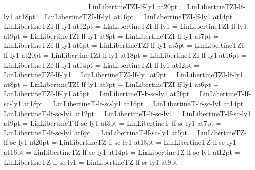 \scriptscriptfont\itfam=\fiveit
%
\def\sl{\fam=\slfam \tensl}%
\textfont\slfam=\tensl
\scriptfont\slfam=\sevensl
\scriptscriptfont\slfam=\fivesl
%
\def\bf{\fam=\bffam \tenbf}%
\textfont\bffam=\tenbf
\scriptfont\bffam=\sevenbf
\scriptscriptfont\bffam=\fivebf
%
\def\tt{\fam=\ttfam \tentt}%
\textfont\ttfam=\tentt
\scriptfont\ttfam=\seventt
\scriptscriptfont\ttfam=\fivett
%
\font\twentyitbf=      LinLibertineTZI-lf-ly1 at20pt
\font\eighteenitbf=    LinLibertineTZI-lf-ly1 at18pt
\font\sixteenitbf=     LinLibertineTZI-lf-ly1 at16pt
\font\fourteenitbf=    LinLibertineTZI-lf-ly1 at14pt
\font\twelveitbf=      LinLibertineTZI-lf-ly1 at12pt
\font\itbf=            LinLibertineTZI-lf-ly1
\font\nineitbf=        LinLibertineTZI-lf-ly1 at9pt
\font\eightitbf=       LinLibertineTZI-lf-ly1 at8pt
\font\sevenitbf=       LinLibertineTZI-lf-ly1 at7pt
\font\sixitbf=         LinLibertineTZI-lf-ly1 at6pt
\font\fiveitbf=        LinLibertineTZI-lf-ly1 at5pt
%
\font\twentyslbf=      LinLibertineTZI-lf-ly1 at20pt
\font\eighteenslbf=    LinLibertineTZI-lf-ly1 at18pt
\font\sixteenslbf=     LinLibertineTZI-lf-ly1 at16pt
\font\fourteenslbf=    LinLibertineTZI-lf-ly1 at14pt
\font\twelveslbf=      LinLibertineTZI-lf-ly1 at12pt
\font\slbf=            LinLibertineTZI-lf-ly1
\font\nineslbf=        LinLibertineTZI-lf-ly1 at9pt
\font\eightslbf=       LinLibertineTZI-lf-ly1 at8pt
\font\sevenslbf=       LinLibertineTZI-lf-ly1 at7pt
\font\sixslbf=         LinLibertineTZI-lf-ly1 at6pt
\font\fiveslbf=        LinLibertineTZI-lf-ly1 at5pt
%
\font\twentycaps=      LinLibertineT-lf-sc-ly1 at20pt
\font\eighteencaps=    LinLibertineT-lf-sc-ly1 at18pt
\font\sixteencaps=     LinLibertineT-lf-sc-ly1 at16pt
\font\fourteencaps=    LinLibertineT-lf-sc-ly1 at14pt
\font\twelvecaps=      LinLibertineT-lf-sc-ly1 at12pt
\font\caps=            LinLibertineT-lf-sc-ly1
\font\ninecaps=        LinLibertineT-lf-sc-ly1 at9pt
\font\eightcaps=       LinLibertineT-lf-sc-ly1 at8pt
\font\sevencaps=       LinLibertineT-lf-sc-ly1 at7pt
\font\sixcaps=         LinLibertineT-lf-sc-ly1 at6pt
\font\fivecaps=        LinLibertineT-lf-sc-ly1 at5pt
%
\font\twentycapsbf=      LinLibertineTZ-lf-sc-ly1 at20pt
\font\eighteencapsbf=    LinLibertineTZ-lf-sc-ly1 at18pt
\font\sixteencapsbf=     LinLibertineTZ-lf-sc-ly1 at16pt
\font\fourteencapsbf=    LinLibertineTZ-lf-sc-ly1 at14pt
\font\twelvecapsbf=      LinLibertineTZ-lf-sc-ly1 at12pt
\font\capsbf=            LinLibertineTZ-lf-sc-ly1
\font\ninecapsbf=        LinLibertineTZ-lf-sc-ly1 at9pt
